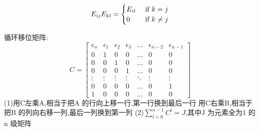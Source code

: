 \documentclass{book}
\begin{document}
$$
E_{ij}E_{kl}=
\begin{cases}
  E_{il} & \textrm{\ if } k=j \\
  0 & \textrm{\ if } k \neq j
\end{cases}
$$

\begin{question}
  循环移位矩阵:
  $$
  C=
  \begin{bmatrix}
    \epsilon_n & \epsilon_1 & \epsilon_2 & \epsilon_3 & \dots & \epsilon_{n-2} & \epsilon_{n-1} \\
    \hline
        0      &     1      &     0      &       0    & \dots &      0         &       0        \\
        0      &     0      &     1      &       0    & \dots &      0         &       0        \\
        0      &     0      &     0      &       1    & \dots &      0         &       0        \\
        \vdots &    \vdots  &     \vdots &     \vdots & \ddots&      \vdots    &       \vdots   \\
        0      &     0      &     0      &       0    & \dots &      0         &       1        \\
        1      &     0      &     0      &       0    & \dots &      0         &       0
  \end{bmatrix}
  $$
  (1)用C左乘A,相当于把A 的行向上移一行,第一行换到最后一行 \newline
  用C右乘B,相当于把B 的列向右移一列,最后一列换到第一列 \newline
  (2)$\sum_{l=0}^{n-1} C^l=J$,其中J 为元素全为1 的n 级矩阵
\end{question}
\end{document}
